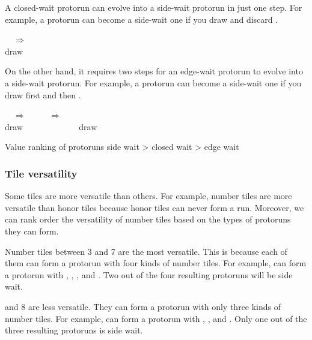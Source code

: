 \bigskip
A closed-wait protorun can evolve into a side-wait protorun in just one step. For example, a protorun {\LARGE{}} can become a side-wait one if you draw {\LARGE{}} and discard {\LARGE{}}. 
\begin{center}
{\LARGE {} ~~$\Rightarrow$~~ }\\
draw {\Large{}}
\end{center}
On the other hand, it requires two steps for an edge-wait protorun to evolve into a side-wait protorun. For example, a protorun {\LARGE{}} can become a side-wait one if you draw {\LARGE{}} first and then {\LARGE{}}. 
\begin{center}
{\LARGE {} ~~$\Rightarrow$~~  ~~ $\Rightarrow$ ~~ 
}\\
draw {\Large{}} ~~~~~~~~~~~~ draw {\Large{}}
\end{center}

\bigskip

\color{MyRed}
\begin{itembox}[c]{Value ranking of protoruns}
\normalcolor
\centering
side wait > closed wait > edge wait
\end{itembox}
\normalcolor

\bigskip

\subsubsection{Tile versatility} \label{sec:versatility}

Some tiles are more versatile than others. 
For example, number tiles are more versatile than honor tiles because honor tiles can never form a run. Moreover, we can rank order the versatility of number tiles based on the types of protoruns they can form.

\bigskip
Number tiles between 3 and 7 are the most versatile. This is because each of them can form a protorun with four kinds of number tiles. For example, {\LARGE{}} can form a protorun with {\LARGE{}}, {\LARGE{}}, {\LARGE{}}, and {\LARGE{}}. Two out of the four resulting protoruns will be side wait.

 and 8 are less versatile. They can form a protorun with only three kinds of number tiles. For example, {\LARGE{}} can form a protorun with {\LARGE{}}, {\LARGE{}}, and {\LARGE{}}. Only one out of the three resulting protoruns is side wait. 

